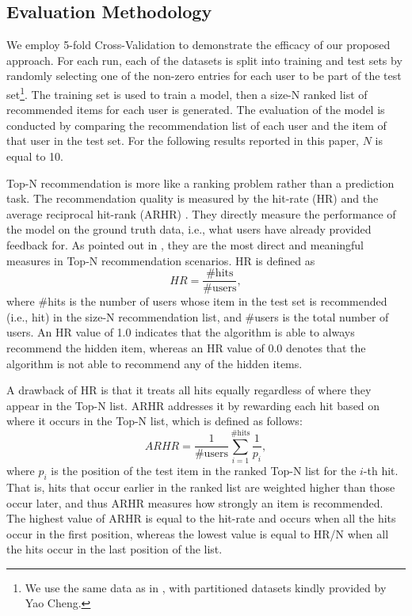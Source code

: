 \documentclass[letterpaper]{article}
\begin{document}
\subsection{Evaluation Methodology}
We employ 5-fold Cross-Validation to demonstrate the efficacy of our proposed approach. For each run, each of the datasets is split into training and test sets by randomly selecting one of the non-zero entries for each user to be part of the test set\footnote{We use the same data as in \cite{cheng2014lorslim}, with partitioned datasets kindly provided by Yao Cheng.}. The training set is used to train a model, then a size-N ranked list of recommended items for each user is generated. The evaluation of the model is conducted by comparing the recommendation list of each user and the item of that user in the test set. For the following results reported in this paper, $N$ is equal to 10.  

Top-N recommendation is more like a ranking problem rather than a prediction task. The recommendation quality is measured by the hit-rate (HR) and the average reciprocal hit-rank (ARHR) \cite{deshpande2004item}. They directly measure the performance of the model on the ground truth data, i.e., what users have already provided feedback for. As pointed out in \cite{ning2011slim}, they are the most direct and meaningful measures in Top-N recommendation scenarios. HR is defined as
\begin{equation}
HR=\frac{\#\textrm{hits}}{\#\textrm{users}},
\end{equation}
where \#hits is the number of users whose item in the test set is recommended (i.e., hit) in the size-N recommendation list, and \#users is the total number of users. An HR value of 1.0 indicates that the algorithm is able to always recommend the hidden item, whereas an HR value of 0.0 denotes that the algorithm is not able to recommend any of the hidden items. 

A drawback of HR is that it treats all hits equally regardless of where they appear in the Top-N list. ARHR addresses it by rewarding each hit based on where it occurs in the Top-N list, which is defined as follows:
\begin{equation}
ARHR=\frac{1}{\#\textrm{users}}\sum_{i=1}^{\#\textrm{hits}}\frac{1}{p_i},
\end{equation}
where $p_i$ is the position of the test item in the ranked Top-N list for the $i$-th hit. That is, hits that occur earlier in the ranked list are weighted higher than those occur later, and thus ARHR measures how strongly an item is recommended. The highest value of ARHR is equal to the hit-rate and occurs when all the hits occur in the first position, whereas the lowest value is equal to HR/N when all the hits occur in the last position of the list.
\end{document}
